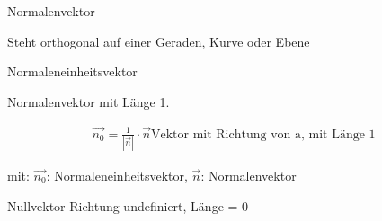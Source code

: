 \begin{sectionbox}
	
	Normalenvektor

	Steht orthogonal auf einer Geraden, Kurve oder Ebene

	Normaleneinheitsvektor
	
	Normalenvektor mit Länge 1.
	
	\begin{emphbox}
		\begin{align*}
			\overrightarrow{n_0} = \frac{1}{|\overrightarrow{n}|} \cdot \overrightarrow{n} \text{Vektor mit Richtung von a, mit Länge 1}
		\end{align*}
	\end{emphbox}
	mit: $\overrightarrow{n_0}$: Normaleneinheitsvektor, $\overrightarrow{n}$: Normalenvektor

	Nullvektor
	Richtung undefiniert, Länge = 0

\end{sectionbox}
